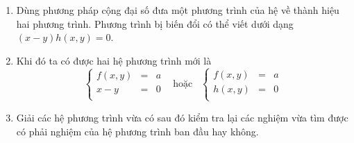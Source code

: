 \documentclass[12pt,a4paper,oneside]{book}
\theoremstyle{theorem}
\theoremstyle{definition}
\begin{document}
\begin{enumerate} 
    \item Dùng phương pháp cộng đại số đưa một phương trình của hệ về thành hiệu hai phương trình. Phương trình bị biến đổi có thể viết dưới dạng $(x-y)h(x,y)=0.$ 
\item Khi đó ta có được hai hệ phương trình mới là 
\[\left\{
\begin{array}{lcl}
\displaystyle f(x,y)&=&a \\[1.5ex]
\displaystyle x-y&=&0\\
\end{array}
\right.\hspace{10pt}\text{hoặc}\hspace{10pt}\left\{
\begin{array}{lcl}
\displaystyle f(x,y)&=&a \\[1.5ex]
\displaystyle h(x,y)&=&0\\
\end{array}
\right.\]
    \item Giải các hệ phương trình vừa có sau đó kiểm tra lại các nghiệm vừa tìm được có phải nghiệm của hệ phương trình ban đầu hay không.
\end{enumerate} 
\end{document}
